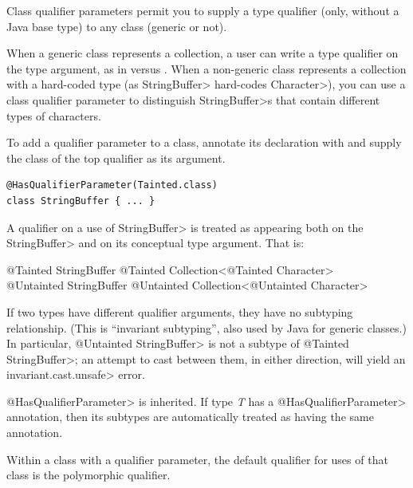 
Class qualifier parameters permit you to supply a type qualifier (only,
without a Java base type) to any class (generic or not).

When a generic class represents a collection, a user can write a type
qualifier on the type argument, as in 
versus .  When a non-generic class
represents a collection with a hard-coded type (as \<StringBuffer>
hard-codes \<Character>), you can use a class qualifier parameter to
distinguish \<StringBuffer>s that contain different types of characters.

To add a qualifier parameter to a class, annotate its declaration with 
and supply the class of the top qualifier as its argument.

\begin{Verbatim}
@HasQualifierParameter(Tainted.class)
class StringBuffer { ... }
\end{Verbatim}

A qualifier on a use of \<StringBuffer> is treated as
appearing both on the \<StringBuffer> and on its conceptual type argument.  That
is:\\
\begin{tt}
  @Tainted StringBuffer \approxsym{} @Tainted Collection<@Tainted Character>\\
  @Untainted StringBuffer \approxsym{} @Untainted Collection<@Untainted Character>
\end{tt}

If two types have different qualifier arguments, they have no subtyping
relationship.  (This is ``invariant subtyping'', also used by Java for
generic classes.)  In particular, \<@Untainted StringBuffer> is not a
subtype of \<@Tainted StringBuffer>; an attempt to cast between them, in
either direction, will yield an \<invariant.cast.unsafe> error.

\<@HasQualifierParameter> is inherited.  If type \textit{T} has a
\<@HasQualifierParameter> annotation, then its subtypes are automatically
treated as having the same annotation.


Within a class with a qualifier parameter,
the default qualifier for uses of that class is the polymorphic qualifier.


